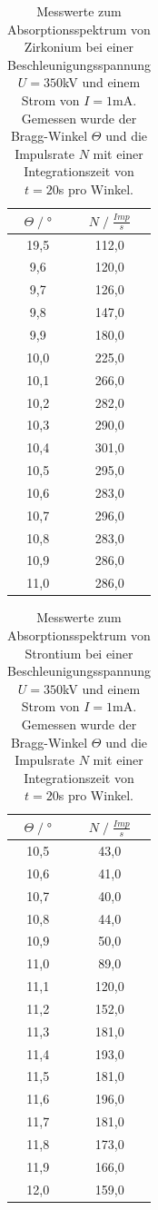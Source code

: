 \begin{table}[H]
    \centering
    \begin{tabular}{c c}
        \toprule
        $\Theta\;/\;°$& $N\;/\;\frac{Imp}{s}$\\
        \midrule
        19,5	&112,0\\
        9,6	    &120,0\\
        9,7	    &126,0\\
        9,8	    &147,0\\
        9,9	    &180,0\\
        10,0	&225,0\\
        10,1	&266,0\\
        10,2	&282,0\\
        10,3	&290,0\\
        10,4	&301,0\\
        10,5	&295,0\\
        10,6	&283,0\\
        10,7	&296,0\\
        10,8	&283,0\\
        10,9	&286,0\\
        11,0	&286,0\\
        \bottomrule
    \end{tabular}
    \caption{Messwerte zum Absorptionsspektrum von Zirkonium bei einer Beschleunigungsspannung 
    $U=350$kV und einem Strom von $I=1$mA.\\
    Gemessen wurde der Bragg-Winkel $\Theta$ und die Impulsrate $N$ mit einer Integrationszeit
    von $t=20$s pro Winkel.}
\end{table}
\begin{table}[H]
    \centering
    \begin{tabular}{c c}
        \toprule
        $\Theta\;/\;°$& $N\;/\;\frac{Imp}{s}$\\
        \midrule
        10,5&	43,0\\
        10,6&	41,0\\
        10,7&	40,0\\
        10,8&	44,0\\
        10,9&	50,0\\
        11,0&	89,0\\
        11,1&	120,0\\
        11,2&	152,0\\
        11,3&	181,0\\
        11,4&	193,0\\
        11,5&	181,0\\
        11,6&	196,0\\
        11,7&	181,0\\
        11,8&	173,0\\
        11,9&	166,0\\
        12,0&	159,0\\
        \bottomrule
    \end{tabular}
    \caption{Messwerte zum Absorptionsspektrum von Strontium bei einer Beschleunigungsspannung 
    $U=350$kV und einem Strom von $I=1$mA.\\
    Gemessen wurde der Bragg-Winkel $\Theta$ und die Impulsrate $N$ mit einer Integrationszeit
    von $t=20$s pro Winkel.}
\end{table}
